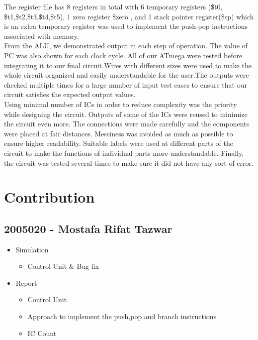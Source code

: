 \documentclass{article}
\begin{document}
The register file has 8 registers in total with 6 temporary registers (\$t0, \$t1,\$t2,\$t3,\$t4,\$t5), 1 zero register \$zero , and 1 
stack pointer register(\$sp) which is an extra temporary register was used to implement the push-pop instructions 
associated with memory.\\
From the ALU, we demonstrated output in each step of operation.
The value of PC was also shown for each clock cycle. All of our ATmega were tested before integrating it to our final circuit.Wires with different sizes were used to make the whole circuit organized and easily
understandable for the user.The outputs were checked multiple times for a large number of input test cases to
ensure that our circuit satisfies the expected output values.\\
Using minimal number of ICs in order to reduce complexity was the priority while designing the 
circuit. Outputs of some of the ICs were reused to minimize the circuit 
even more. The connections were made carefully and the components were placed at fair distances. 
Messiness was avoided as much as possible to ensure higher readability. Suitable labels were 
used at different parts of the circuit to make the functions of individual parts more 
understandable. Finally, the circuit was tested several times to make sure it did not have any sort 
of error.

\section{Contribution}
\subsection*{2005020 - Mostafa Rifat Tazwar}
\begin{itemize}
    \item Simulation
    \begin{itemize}
        \item Control Unit \& Bug fix
    \end{itemize}
    \item Report
    \begin{itemize}
        \item Control Unit
        \item Approach to implement the push,pop and branch instructions 
        \item IC Count
    \end{itemize}
\end{itemize}
\end{document}
